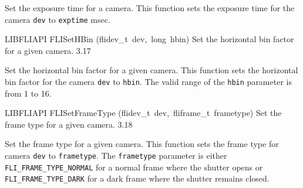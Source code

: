 \documentclass{article}
\begin{document}
\begin{cxxentry}
\begin{cxxfunction}
\begin{cxxdoc}
Set the exposure time for a camera.  This function sets the
exposure time for the camera \texttt{dev} to \texttt{exptime} msec.


\end{cxxdoc}
\end{cxxfunction}
\begin{cxxfunction}
{LIBFLIAPI}
        {FLISetHBin}
        {(flidev\_t\ dev,\ long\ hbin)}
        { Set the horizontal bin factor for a given camera.}
        {3.17}
\begin{cxxdoc}

Set the horizontal bin factor for a given camera.  This function
sets the horizontal bin factor for the camera \texttt{dev} to
\texttt{hbin}.  The valid range of the \texttt{hbin} parameter is
from 1 to 16.


\end{cxxdoc}
\end{cxxfunction}
\begin{cxxfunction}
{LIBFLIAPI}
        {FLISetFrameType}
        {(flidev\_t\ dev,\ fliframe\_t\ frametype)}
        { Set the frame type for a given camera.}
        {3.18}
\begin{cxxdoc}

Set the frame type for a given camera.  This function sets the frame type
for camera \texttt{dev} to \texttt{frametype}.  The \texttt{frametype}
parameter is either \texttt{FLI\_FRAME\_TYPE\_NORMAL} for a normal frame
where the shutter opens or \texttt{FLI\_FRAME\_TYPE\_DARK} for a dark frame
where the shutter remains closed.



\end{cxxdoc}
\end{cxxfunction}
\end{cxxentry}
\end{document}
